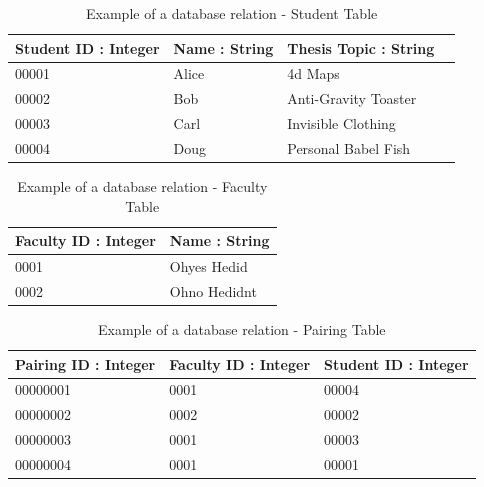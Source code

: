 \begin{table}
    \begin{center}
    \begin{tabular}{ | l | l | l | l | }
    \hline
    Student ID : Integer & Name : String & Thesis Topic : String \\ \hline
    00001 & Alice & 4d Maps \\ \hline
    00002 & Bob &  Anti-Gravity Toaster \\ \hline
    00003 & Carl & Invisible Clothing \\ \hline
    00004 & Doug & Personal Babel Fish \\
    \hline
    \end{tabular}
    \end{center}
    \caption{Example of a database relation - Student Table}
    \label{tab:studentrelation}
\end{table}

\begin{table}
    \begin{center}
    \begin{tabular}{ | l | l | }
    \hline
    Faculty ID : Integer & Name : String \\ \hline
    0001 & Ohyes Hedid \\ \hline
    0002 & Ohno Hedidnt \\
    \hline
    \end{tabular}
    \end{center}
    \caption{Example of a database relation - Faculty Table}
    \label{tab:facultyrelation}
\end{table}

\begin{table}
    \begin{center}
    \begin{tabular}{ | l | l | l | }
    \hline
    Pairing ID : Integer & Faculty ID : Integer & Student ID : Integer \\ \hline
    00000001 & 0001 & 00004 \\ \hline
    00000002 & 0002 & 00002 \\ \hline
    00000003 & 0001 & 00003 \\ \hline
    00000004 & 0001 & 00001 \\ 
    \hline
    \end{tabular}
    \end{center}
    \caption{Example of a database relation - Pairing Table}
    \label{tab:relation}
\end{table}

